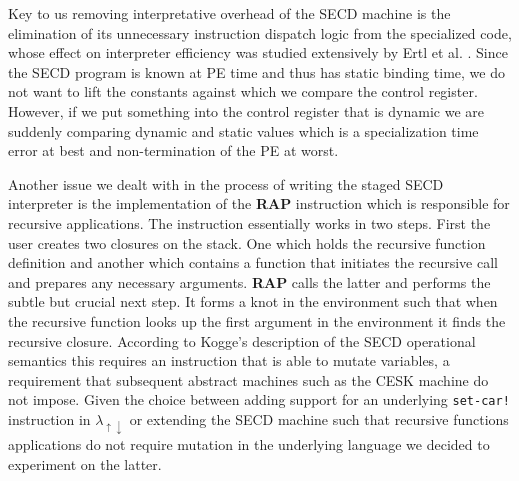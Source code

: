 \documentclass[a4paper,12pt,twoside,openright]{report}
\theoremstyle{definition}
\newcommand{\mslang}{$\lambda_{\uparrow\downarrow}$}
\begin{document}
Key to us removing interpretative overhead of the SECD machine is the elimination of its unnecessary instruction dispatch logic from the specialized code, whose effect on interpreter efficiency was studied extensively by Ertl et al. \cite{ertl2003structure}. Since the SECD program is known at PE time and thus has static binding time, we do not want to lift the constants against which we compare the control register. However, if we put something into the control register that is dynamic we are suddenly comparing dynamic and static values which is a specialization time error at best and non-termination of the PE at worst.

Another issue we dealt with in the process of writing the staged SECD interpreter is the implementation of the \textbf{RAP} instruction which is responsible for recursive applications. The instruction essentially works in two steps. First the user creates two closures on the stack. One which holds the recursive function definition and another which contains a function that initiates the recursive call and prepares any necessary arguments. \textbf{RAP} calls the latter and performs the subtle but crucial next step. It forms a knot in the environment such that when the recursive function looks up the first argument in the environment it finds the recursive closure. According to Kogge's \cite{kogge1990architecture} description of the SECD operational semantics this requires an instruction that is able to mutate variables, a requirement that subsequent abstract machines such as the CESK machine \cite{felleisen1987calculi} do not impose. Given the choice between adding support for an underlying \texttt{set-car!} instruction in \mslang{} or extending the SECD machine such that recursive functions applications do not require mutation in the underlying language we decided to experiment on the latter.


\end{document}
